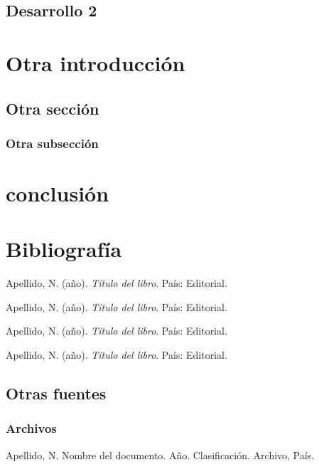 \documentclass[12pt,letterpaper,oneside]{report}
\begin{document}
\section{Desarrollo 2}

\lipsum[2-4]


\chapter{Otra introducción}

\lipsum[1-4]

\section{Otra sección}

\lipsum[1-3]

\subsection{Otra subsección}

\lipsum[4-6]


\chapter{conclusión}

\lipsum[1-4]

\chapter*{Bibliografía}

Apellido, N. (año). \emph{Título del libro}. País: Editorial.

Apellido, N. (año). \emph{Título del libro}. País: Editorial.

Apellido, N. (año). \emph{Título del libro}. País: Editorial.

Apellido, N. (año). \emph{Título del libro}. País: Editorial.

\clearpage{\pagestyle{empty}\cleardoublepage}

\section*{Otras fuentes}

\subsection*{Archivos}

Apellido, N. Nombre del documento. Año. Clasificación. Archivo, País.
\end{document}
